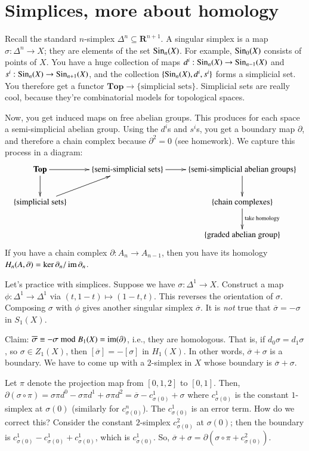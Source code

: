 \section{Simplices, more about homology}
Recall the standard $n$-simplex $\Delta^n\subseteq\mathbf{R}^{n+1}$. A singular simplex is a map $\sigma:\Delta^n\to X$; they are elements of the set $\mathrm{Sin}_n(X)$. For example, $\mathrm{Sin}_0(X)$ consists of points of $X$. You have a huge collection of maps $d^i:\mathrm{Sin}_n(X)\to\mathrm{Sin}_{n-1}(X)$ and $s^i:\mathrm{Sin}_n(X)\to\mathrm{Sin}_{n+1}(X)$, and the collection $\{\mathrm{Sin}_n(X),d^i,s^i\}$ forms a simplicial set. You therefore get a functor $\mathbf{Top}\to\{\text{simplicial sets}\}$. Simplicial sets are really cool, because they're combinatorial models for topological spaces.

Now, you get induced maps on free abelian groups. This produces for each space a semi-simplicial abelian group. Using the $d^i$s and $s^i$s, you get a boundary map $\partial$, and therefore a chain complex because $\partial^2=0$ (see homework). We capture this process in a diagram:
\begin{equation*}
\xymatrix{\mathbf{Top}\ar[d]\ar[r] & \{\text{semi-simplicial sets}\}\ar[r] & \{\text{semi-simplicial abelian groups}\}\ar[d]\\
    \{\text{simplicial sets}\}\ar[ur] & & \{\text{chain complexes}\}\ar[d]^{\text{take homology}}\\
 & &\{\text{graded abelian group}\}}
\end{equation*}
If you have a chain complex $\partial:A_n\to A_{n-1}$, then you have its homology $H_n(A,\partial)=\ker\partial_n/\operatorname{im}\partial_n$.

Let's practice with simplices. Suppose we have $\sigma:\Delta^1\to X$. Construct a map $\phi:\Delta^1\to\Delta^1$ via $(t,1-t)\mapsto (1-t,t)$. This reverses the orientation of $\sigma$. Composing $\sigma$ with $\phi$ gives another singular simplex $\overline{\sigma}$. It is \textit{not} true that $\overline{\sigma}=-\sigma$ in $S_1(X)$.

Claim: $\overline{\sigma}\equiv -\sigma\bmod B_1(X)=\operatorname{im}(\partial)$, i.e., they are homologous. That is, if $d_0\sigma=d_1\sigma$, so $\sigma\in Z_1(X)$, then $[\overline{\sigma}]=-[\sigma]$ in $ H_1(X)$. In other words, $\overline{\sigma}+\sigma$ is a boundary. We have to come up with a $2$-simplex in $X$ whose boundary is $\overline{\sigma}+\sigma$.

Let $\pi$ denote the projection map from $[0,1,2]$ to $[0,1]$. Then, $\partial(\sigma\circ\pi)=\sigma\pi d^0-\sigma\pi d^1 +\sigma\pi d^2=\overline{\sigma}-c^1_{\sigma(0)}+\sigma$ where $c^1_{\sigma(0)}$ is the constant $1$-simplex at $\sigma(0)$ (similarly for $c^n_{\sigma(0)}$). The $c^1_{\sigma(0)}$ is an error term. How do we correct this? Consider the constant $2$-simplex $c^2_{\sigma(0)}$ at $\sigma(0)$; then the boundary is $c^1_{\sigma(0)}-c^1_{\sigma(0)}+c^1_{\sigma(0)}$, which is $c^1_{\sigma(0)}$. So, $\overline{\sigma}+\sigma=\partial(\sigma\circ\pi + c^2_{\sigma(0)})$.

